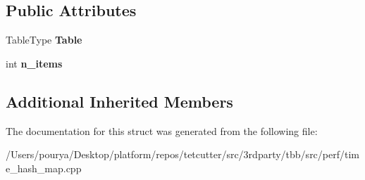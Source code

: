 \subsection*{Public Attributes}
\begin{DoxyCompactItemize}
\item 
\hypertarget{structTestTBBMap_a7c949645ff91ece899a3610795e01d26}{}Table\+Type {\bfseries Table}\label{structTestTBBMap_a7c949645ff91ece899a3610795e01d26}

\item 
\hypertarget{structTestTBBMap_a169b95e3216a42bce594dff305ea6d0b}{}int {\bfseries n\+\_\+items}\label{structTestTBBMap_a169b95e3216a42bce594dff305ea6d0b}

\end{DoxyCompactItemize}
\subsection*{Additional Inherited Members}


The documentation for this struct was generated from the following file\+:\begin{DoxyCompactItemize}
\item 
/\+Users/pourya/\+Desktop/platform/repos/tetcutter/src/3rdparty/tbb/src/perf/time\+\_\+hash\+\_\+map.\+cpp\end{DoxyCompactItemize}
